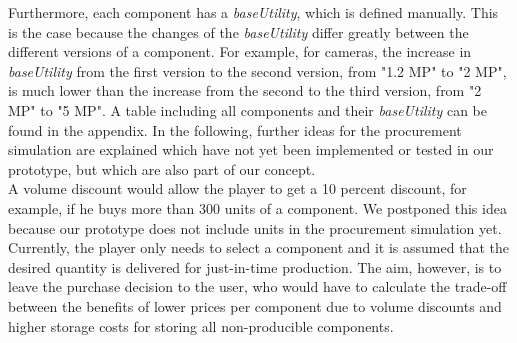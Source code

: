 Furthermore, each component has a \textit{baseUtility}, which is defined manually. This is the case because the changes of the \textit{baseUtility} differ greatly between the different versions of a component. For example, for cameras, the increase in \textit{baseUtility} from the first version to the second version, from "1.2 MP" to "2 MP", is much lower than the increase from the second to the third version, from "2 MP" to "5 MP". A table including all components and their \textit{baseUtility} can be found in the appendix. %
\newline
\newline
In the following, further ideas for the procurement simulation are explained which have not yet been implemented or tested in our prototype, but which are also part of our concept.\\
A volume discount would allow the player to get a 10 percent discount, for example, if he buys more than 300 units of a component. We postponed this idea because our prototype does not include units in the procurement simulation yet. Currently, the player only needs to select a component and it is assumed that the desired quantity is delivered for just-in-time production. 
The aim, however, is to leave the purchase decision to the user, who would have to calculate the trade-off between the benefits of lower prices per component due to volume discounts and higher storage costs for storing all non-producible components.

